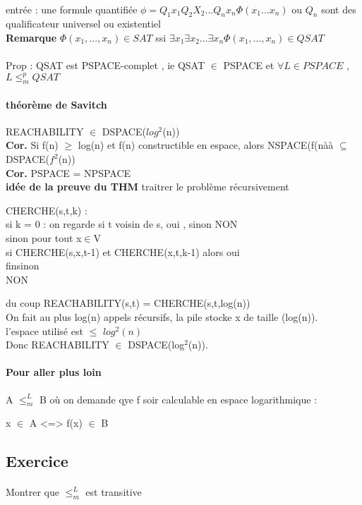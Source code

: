 \documentclass{article}
\begin{document}
\paragraph{} entrée : une formule quantifiée $ \phi = Q_1 x_1Q_2X_2...Q_nx_n\Phi(x_1...x_n)$ ou $Q_n$ sont des qualificateur universel ou existentiel\\
\textbf{Remarque} $\Phi(x_1,...,x_n) \in SAT$ ssi $\exists x_1\exists x_2...\exists x_n \Phi(x_1,...,x_n) \in QSAT$
\\\\
Prop  : QSAT est PSPACE-complet , ie QSAT $\in$ PSPACE et $\forall L \in PSPACE$ , $L \leq_m^p QSAT$

\paragraph{théorème de Savitch} REACHABILITY $\in$ DSPACE($log^2$(n))\\
\textbf{Cor.} Si f(n) $ \geq$ log(n) et f(n) constructible en espace, alors NSPACE(f(nàà $\subseteq$ DSPACE($f^2$(n))\\
\textbf{Cor.} PSPACE = NPSPACE\\\textbf{idée de la preuve du THM} traitrer le problème récursivement \\
\begin{center}
CHERCHE(s,t,k) : \\
si k = 0 : on regarde si t voisin de s, oui , sinon NON\\
sinon pour tout x$\in$V\\
	si CHERCHE(s,x,t-1) et CHERCHE(x,t,k-1) alors oui\\
	finsinon\\
	NON
\end{center}
du coup REACHABILITY(s,t) = CHERCHE(s,t,log(n))\\On fait au plus log(n) appels récursifs, la pile stocke x de taille (log(n)).\\l'espace utilisé est $\leq$ $log^2(n)$\\
Donc REACHABILITY $\in$ DSPACE(log$^2$(n)).\\
\paragraph{Pour aller plus loin} A $\leq_m^L$ B où on demande qye f soir calculable en espace logarithmique :\\
\begin{center}
x $\in $ A <=> f(x) $\in$ B
\end{center}

\subsection{Exercice} 
\paragraph{} Montrer que $\leq_m^L$ est transitive
\end{document}
